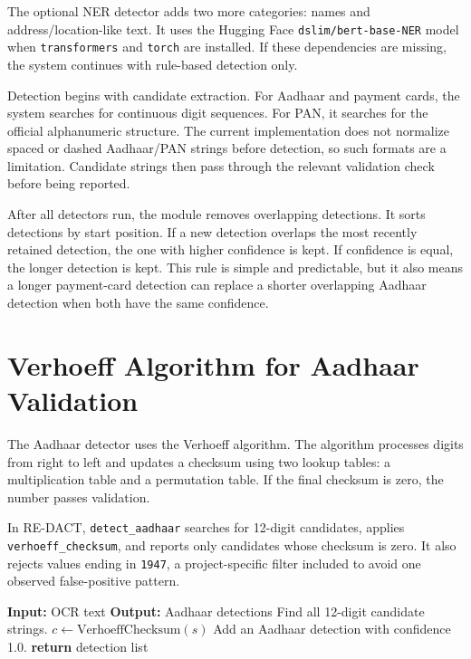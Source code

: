 The optional NER detector adds two more categories: names and address/location-like text. It uses the Hugging Face \texttt{dslim/bert-base-NER} model when \texttt{transformers} and \texttt{torch} are installed. If these dependencies are missing, the system continues with rule-based detection only.

Detection begins with candidate extraction. For Aadhaar and payment cards, the system searches for continuous digit sequences. For PAN, it searches for the official alphanumeric structure. The current implementation does not normalize spaced or dashed Aadhaar/PAN strings before detection, so such formats are a limitation. Candidate strings then pass through the relevant validation check before being reported.

After all detectors run, the module removes overlapping detections. It sorts detections by start position. If a new detection overlaps the most recently retained detection, the one with higher confidence is kept. If confidence is equal, the longer detection is kept. This rule is simple and predictable, but it also means a longer payment-card detection can replace a shorter overlapping Aadhaar detection when both have the same confidence.

\section{Verhoeff Algorithm for Aadhaar Validation}

The Aadhaar detector uses the Verhoeff algorithm. The algorithm processes digits from right to left and updates a checksum using two lookup tables: a multiplication table and a permutation table. If the final checksum is zero, the number passes validation.

In RE-DACT, \texttt{detect\_aadhaar} searches for 12-digit candidates, applies \texttt{verhoeff\_checksum}, and reports only candidates whose checksum is zero. It also rejects values ending in \texttt{1947}, a project-specific filter included to avoid one observed false-positive pattern.

\begin{algorithmic}[1]
\STATE \textbf{Input:} OCR text
\STATE \textbf{Output:} Aadhaar detections
\STATE Find all 12-digit candidate strings.
    \STATE $c \leftarrow \text{VerhoeffChecksum}(s)$
        \STATE Add an Aadhaar detection with confidence 1.0.
    \ENDIF
\ENDFOR
\STATE \textbf{return} detection list
\end{algorithmic}

